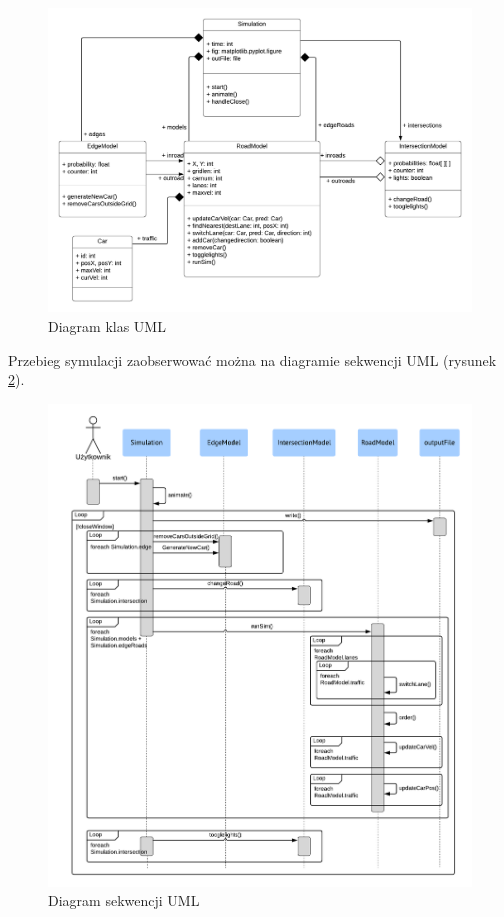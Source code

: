 \documentclass[a4paper,12pt]{article}
\begin{document}
\begin{figure}[!ht]
	\centering
	\includegraphics[scale=0.6]{MiSS_Class_Diagram.png}
	\caption{Diagram klas UML}
	\label{fig:klasy}
\end{figure}

\newpage
Przebieg symulacji zaobserwować można na diagramie sekwencji UML (rysunek \ref{fig:sekwencja}).

\begin{figure}[!h]
	\centering
	\includegraphics[scale=0.6]{MiSS_Sequene_Diagram.png}
	\caption{Diagram sekwencji UML}
	\label{fig:sekwencja}
\end{figure}
\end{document}
